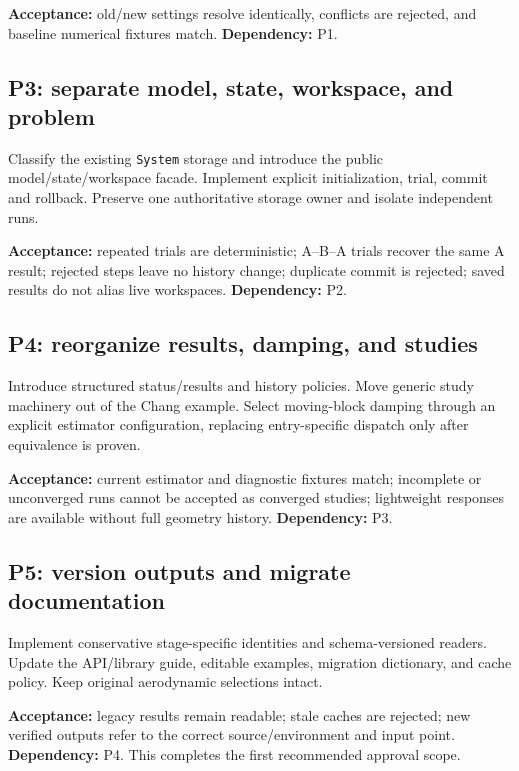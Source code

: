\documentclass[11pt,a4paper]{article}
\newcommand{\code}{\nolinkurl}
\begin{document}
\textbf{Acceptance:} old/new settings resolve identically, conflicts are
rejected, and baseline numerical fixtures match.
\textbf{Dependency:} P1.

\subsection{P3: separate model, state, workspace, and problem}

Classify the existing \code{System} storage and introduce the public
model/state/workspace facade. Implement explicit initialization, trial,
commit and rollback. Preserve one authoritative storage owner and isolate
independent runs.

\textbf{Acceptance:} repeated trials are deterministic; A--B--A trials recover
the same A result; rejected steps leave no history change; duplicate commit
is rejected; saved results do not alias live workspaces.
\textbf{Dependency:} P2.

\subsection{P4: reorganize results, damping, and studies}

Introduce structured status/results and history policies. Move generic study
machinery out of the Chang example. Select moving-block damping through an
explicit estimator configuration, replacing entry-specific dispatch only
after equivalence is proven.

\textbf{Acceptance:} current estimator and diagnostic fixtures match;
incomplete or unconverged runs cannot be accepted as converged studies;
lightweight responses are available without full geometry history.
\textbf{Dependency:} P3.

\subsection{P5: version outputs and migrate documentation}

Implement conservative stage-specific identities and schema-versioned readers.
Update the API/library guide, editable examples, migration dictionary, and
cache policy. Keep original aerodynamic selections intact.

\textbf{Acceptance:} legacy results remain readable; stale caches are rejected;
new verified outputs refer to the correct source/environment and input point.
\textbf{Dependency:} P4. This completes the first recommended approval scope.
\end{document}
